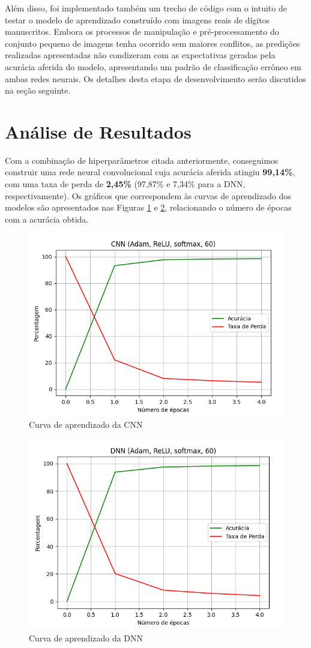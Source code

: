 \documentclass[a4paper, 12pt]{article}
\begin{document}
Além disso, foi implementado também um trecho de código com o intuito de testar o modelo de aprendizado construído com imagens reais de dígitos manuscritos. Embora os processos de manipulação e pré-processamento do conjunto pequeno de imagens tenha ocorrido sem maiores conflitos, as predições realizadas apresentadas não condizeram com as expectativas geradas pela acurácia aferida do modelo, apresentando um padrão de classificação errôneo em ambas redes neurais. Os detalhes desta etapa de desenvolvimento serão discutidos na seção seguinte.

\section{Análise de Resultados}

Com a combinação de hiperparâmetros citada anteriormente, conseguimos construir uma rede neural convolucional cuja acurácia aferida atingiu \textbf{99,14\%}, com uma taxa de perda de \textbf{2,45\%} (97,87\% e 7,34\% para a DNN, respectivamente). Os gráficos que correspondem às curvas de aprendizado dos modelos são apresentados nas Figuras \ref{fig:exanpleFig1} e \ref{fig:exanpleFig2}, relacionando o número de épocas com a acurácia obtida.

\vspace*{-0.5cm}
\begin{figure}[H]
    \centering
    \includegraphics[width=.72\textwidth]{Images/cnn.png}
    \caption{Curva de aprendizado da CNN}
    \label{fig:exanpleFig1}
\end{figure}
\vspace*{-0.5cm}
\begin{figure}[H]
    \centering
    \includegraphics[width=.72\textwidth]{Images/dnn.png}
    \caption{Curva de aprendizado da DNN}
    \label{fig:exanpleFig2}
\end{figure}
\end{document}
